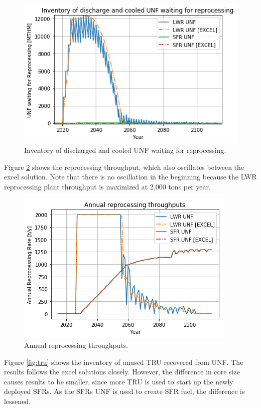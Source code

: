 \begin{figure}[htbp!]
    \begin{center}
        \includegraphics[scale=0.6]{./images/results_18/waiting_monthly.png}
    \end{center}
        \caption{Inventory of discharged and cooled \gls{UNF} waiting for reprocessing.}
    \label{fig:waiting_monthly}
\end{figure}


Figure \ref{fig:rep} shows the reprocessing throughput, which also oscillates between
the excel solution. Note that there is no oscillation in the beginning because the
\gls{LWR} reprocessing plant throughput is maximized at 2,000 tons per year. 

\begin{figure}[htbp!]
    \begin{center}
        \includegraphics[scale=0.6]{./images/results_18/rep.png}
    \end{center}
        \caption{Annual reprocessing throughputs.}
    \label{fig:rep}
\end{figure}


Figure \ref{fig:tru} shows the inventory of unused \gls{TRU} recovered from \gls{UNF}.
The \Cyclus results follows the excel solutions closely. However, the difference
in core size causes \Cyclus results to be smaller, since more \gls{TRU} is used to
start up the newly deployed \glspl{SFR}. As the \glspl{SFR} \gls{UNF} is used to
create \gls{SFR} fuel, the difference is lessened.

